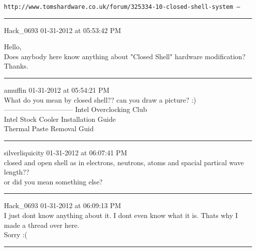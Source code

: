 \documentclass[11pt,twoside,a4paper]{book}
\begin{document}
\clearpage

\texttt{http://www.tomshardware.co.uk/forum/325334-10-closed-shell-system --}

\begin{multicols*}{2}
	\small
	
\begin{center} \rule{0.45\textwidth}{0.01cm} \end{center}
	
Hack\_0693  01-31-2012 at 05:53:42 PM 

Hello,~\\
Does anybody here know anything about "Closed Shell" hardware modification?~\\
Thanks.

\begin{center} \rule{0.45\textwidth}{0.01cm} \end{center}

amuffin 01-31-2012 at 05:54:21 PM~\\

What do you mean by closed shell?? can you draw a picture? :)~\\
------------------------------ Intel Overclocking Club~\\
Intel Stock Cooler Installation Guide~\\
Thermal Paste Removal Guid

\begin{center} \rule{0.45\textwidth}{0.01cm} \end{center}

silverliquicity 01-31-2012 at 06:07:41 PM~\\

closed and open shell as in electrons, neutrons, atoms and spacial partical wave length??~\\

or did you mean something else?

\begin{center} \rule{0.45\textwidth}{0.01cm} \end{center}

Hack\_0693 01-31-2012 at 06:09:13 PM~\\

I just dont know anything about it. I dont even know what it is. Thats why I made a thread over here.~\\
Sorry :(

\begin{center} \rule{0.45\textwidth}{0.01cm} \end{center}


\end{multicols*}
\end{document}
